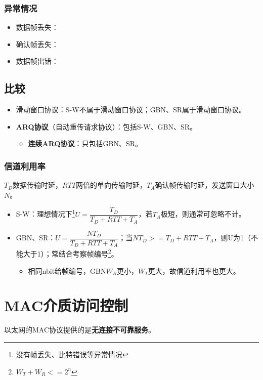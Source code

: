 \subsubsection{异常情况}
\begin{itemize}
    \item 数据帧丢失：
    \item 确认帧丢失：
    \item 数据帧出错：
\end{itemize}


\subsection{比较}
\begin{itemize}
    \item 滑动窗口协议：S-W不属于滑动窗口协议；GBN、SR属于滑动窗口协议。
    \item \textbf{ARQ协议}（自动重传请求协议）：包括S-W、GBN、SR。\begin{itemize}
        \item \textbf{连续ARQ协议}：只包括GBN、SR。
    \end{itemize}
\end{itemize}

\subsubsection{信道利用率}
\(T_D\)数据传输时延，\(RTT\)两倍的单向传输时延，\(T_A\)确认帧传输时延，发送窗口大小\(N\)。
\begin{itemize}
    \item S-W：理想情况下\footnote{没有帧丢失、比特错误等异常情况}\(U = \dfrac{T_D}{T_D + RTT + T_A}\)，若\(T_A\)极短，则通常可忽略不计。
    \item GBN、SR：\(U = \dfrac{NT_D}{T_D + RTT + T_A}\)；当\(NT_D >= T_D + RTT + T_A\)，则U为1（不能大于1）；常结合考察帧编号\footnote{\(W_T + W_R <= 2^n\)}。
    \begin{itemize}
        \item 相同nbit给帧编号，GBN\(W_R\)更小，\(W_T\)更大，故信道利用率也更大。
    \end{itemize}
\end{itemize}


\section{MAC介质访问控制}

以太网的MAC协议提供的是\textbf{无连接不可靠服务}。


